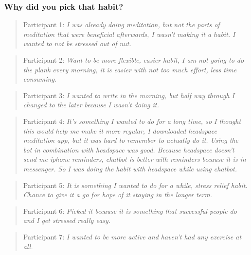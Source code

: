 \subsubsection*{Why did you pick that habit?}
\begin{quote}
Participant 1: \textit{I was already doing meditation, but not the parts of meditation that were beneficial afterwards, I wasn't making it a habit. I wanted to not be stressed out of nut.}
\end{quote}
\begin{quote}
Participant 2: \textit{Want to be more flexible, easier habit, I am not going to do the plank every morning, it is easier with not too much effort, less time consuming.}
\end{quote}
\begin{quote}
Participant 3: \textit{I wanted to write in the morning, but half way through I changed to the later because I wasn't doing it.}
\end{quote}
\begin{quote}
Participant 4: \textit{It's something I wanted to do for a long time, so I thought this would help me make it more regular, I downloaded headspace meditation app, but it was hard to remember to actually do it. Using the bot in combination with headspace was good. Because headspace doesn't send me iphone reminders, chatbot is better with reminders because it is in messenger. So I was doing the habit with headspace while using chatbot.}
\end{quote}
\begin{quote}
Participant 5: \textit{It is something I wanted to do for a while, stress relief habit. Chance to give it a go for hope of it staying in the longer term.}
\end{quote}
\begin{quote}
Participant 6: \textit{Picked it because it is something that successful people do and I get stressed really easy.}
\end{quote}
\begin{quote}
Participant 7: \textit{I wanted to be more active and haven't had any exercise at all.}
\end{quote}

